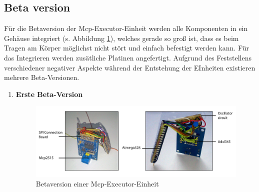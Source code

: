 \subsection{Beta version}
\label{kap:McpExecutorBetaversion}
Für die Betaversion der Mcp-Executor-Einheit werden alle Komponenten in ein Gehäuse integriert (s. Abbildung \ref{fig:McpExecutorBeta}), welches gerade so groß ist, dass es beim Tragen am Körper möglichst nicht stört und einfach befestigt werden kann. Für das Integrieren werden zusätliche Platinen angefertigt.
\newline
Aufgrund des Feststellens verschiedener negativer Aspekte während der Entstehung der EInheiten existieren mehrere Beta-Versionen.

\begin{enumerate}
	\item \textbf{Erste Beta-Version} \\
\begin{figure}[H]
	\centering
	\includegraphics[width=1.0\linewidth]{Bilder/McpExecutor_BetaDetail}
	\caption[Betaversion einer Mcp-Executor-Einheit]{Betaversion einer Mcp-Executor-Einheit}
	\label{fig:McpExecutorBeta}
\end{figure}


\end{enumerate}

